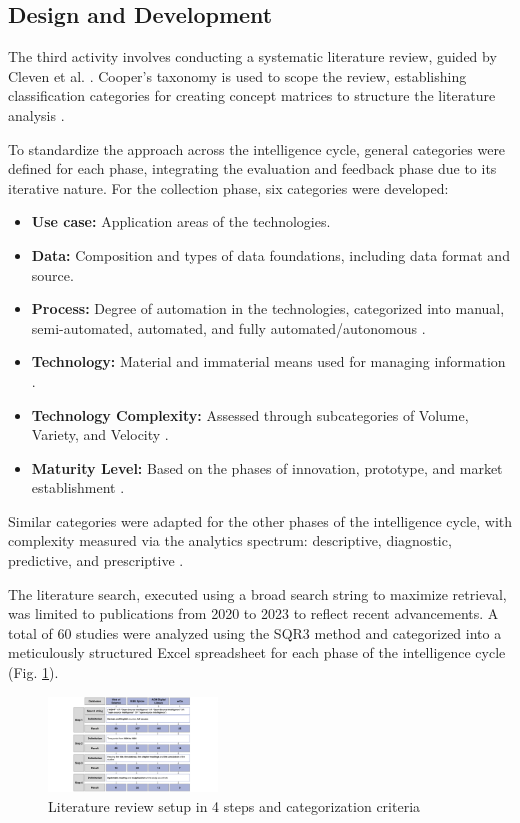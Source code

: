 \documentclass[10pt]{article}
\begin{document}
\subsection{Design and Development}
The third activity involves conducting a systematic literature review, guided by Cleven et al. \cite{Cleven.2009}. Cooper's taxonomy \cite{Cooper.1988} is used to scope the review, establishing classification categories for creating concept matrices to structure the literature analysis \cite{Webster.2002}.

To standardize the approach across the intelligence cycle, general categories were defined for each phase, integrating the evaluation and feedback phase due to its iterative nature. For the collection phase, six categories were developed:
\begin{itemize}
    \item \textbf{Use case:} Application areas of the technologies.
    \item \textbf{Data:} Composition and types of data foundations, including data format and source.
    \item \textbf{Process:} Degree of automation in the technologies, categorized into manual, semi-automated, automated, and fully automated/autonomous \cite{Duncheon.2002, Billings.1997, Endsley.1999}.
    \item \textbf{Technology:} Material and immaterial means used for managing information \cite{Bleck.2004}.
    \item \textbf{Technology Complexity:} Assessed through subcategories of Volume, Variety, and Velocity \cite{Elgendy.2014, Singh.2012}.
    \item \textbf{Maturity Level:} Based on the phases of innovation, prototype, and market establishment \cite{Stich.2022}.
\end{itemize}

Similar categories were adapted for the other phases of the intelligence cycle, with complexity measured via the analytics spectrum: descriptive, diagnostic, predictive, and prescriptive \cite{Delen.2013}.

The literature search, executed using a broad search string to maximize retrieval, was limited to publications from 2020 to 2023 to reflect recent advancements. A total of 60 studies were analyzed using the SQR3 method \cite{Robinson.1970} and categorized into a meticulously structured Excel spreadsheet for each phase of the intelligence cycle (Fig. \ref{fig:LiteratureReview}).

\begin{figure}[t]
    \centering
    \includegraphics[width=0.4\textwidth]{PDF/images/crop_Kategorisierungskriterien und Literraturreviewaufbau}
    \caption{Literature review setup in 4 steps and categorization criteria}
    \label{fig:LiteratureReview}
\end{figure}
\end{document}
